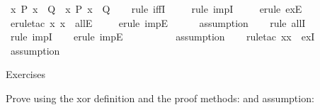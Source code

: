 \begin{isabellebody}
\isamarkupfalse%
\ {\isachardoublequoteopen}{\isacharparenleft}{\kern0pt}{\isasymforall}x{\isachardot}{\kern0pt}\ P\ x\ {\isasymlongrightarrow}\ Q{\isacharparenright}{\kern0pt}\ {\isacharequal}{\kern0pt}\ {\isacharparenleft}{\kern0pt}{\isacharparenleft}{\kern0pt}{\isasymexists}x{\isachardot}{\kern0pt}\ P\ x{\isacharparenright}{\kern0pt}\ {\isasymlongrightarrow}\ Q{\isacharparenright}{\kern0pt}{\isachardoublequoteclose}\isanewline
%
\isadelimproof
\ \ %
\endisadelimproof
%
\isatagproof
{}\isamarkupfalse%
\ {\isacharparenleft}{\kern0pt}rule\ iffI{\isacharparenright}{\kern0pt}\isanewline
\ \ \ \isamarkupfalse%
\ {\isacharparenleft}{\kern0pt}rule\ impI{\isacharparenright}{\kern0pt}\isanewline
\ \ \ \isamarkupfalse%
\ {\isacharparenleft}{\kern0pt}erule\ exE{\isacharparenright}{\kern0pt}\ \isanewline
\ \ \ \isamarkupfalse%
\ {\isacharparenleft}{\kern0pt}erule{\isacharunderscore}{\kern0pt}tac\ x{\isacharequal}{\kern0pt}\ x\ \ allE{\isacharparenright}{\kern0pt}\isanewline
\ \ \ \isamarkupfalse%
\ {\isacharparenleft}{\kern0pt}erule\ impE{\isacharparenright}{\kern0pt}\isanewline
\ \ \ \ \isamarkupfalse%
\ assumption{\isacharplus}{\kern0pt}\isanewline
\ \ \isamarkupfalse%
\ {\isacharparenleft}{\kern0pt}rule\ allI{\isacharparenright}{\kern0pt}\isanewline
\ \ \isamarkupfalse%
\ {\isacharparenleft}{\kern0pt}rule\ impI{\isacharparenright}{\kern0pt}\isanewline
\ \ \isamarkupfalse%
\ {\isacharparenleft}{\kern0pt}erule\ impE{\isacharparenright}{\kern0pt}\isanewline
\ \ \ \isamarkupfalse%
\ \isanewline
\ \ \ \isamarkupfalse%
\ assumption\isanewline
\ \ \isamarkupfalse%
\ {\isacharparenleft}{\kern0pt}rule{\isacharunderscore}{\kern0pt}tac\ x{\isacharequal}{\kern0pt}x\ \ exI{\isacharparenright}{\kern0pt}\isanewline
\ \ \isamarkupfalse%
\ assumption\isanewline
\ \ \isamarkupfalse%
%
\endisatagproof
{\isafoldproof}%
%
\isadelimproof
%
\endisadelimproof
%
\begin{isamarkuptext}%
Exercises%
\end{isamarkuptext}\isamarkuptrue%
%
\begin{isamarkuptext}%
Prove using the xor definition and 
the proof methods:  and assumption:%

\end{isamarkuptext}
\end{isabellebody}
